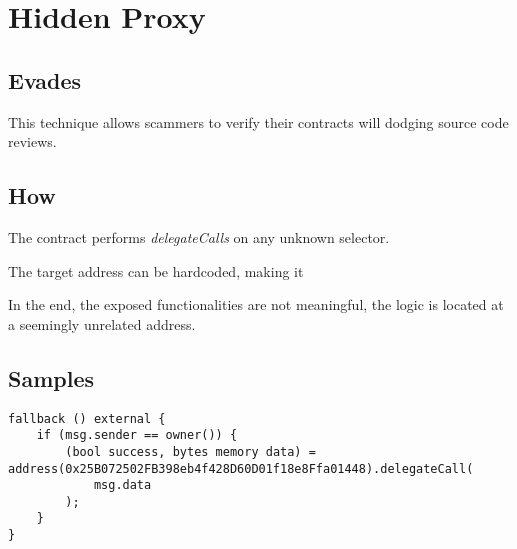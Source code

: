 \section{Hidden Proxy}

\subsection{Evades}

This technique allows scammers to verify their contracts will dodging source code reviews.

\subsection{How}

The contract performs \emph{delegateCalls} on any unknown selector.

The target address can be hardcoded, making it 

In the end, the exposed functionalities are not meaningful, the logic is located at a seemingly unrelated address.

\subsection{Samples}

\begin{lstlisting}
fallback () external {
	if (msg.sender == owner()) {
		(bool success, bytes memory data) = address(0x25B072502FB398eb4f428D60D01f18e8Ffa01448).delegateCall(
			msg.data
		);
	}
}
\end{lstlisting}
